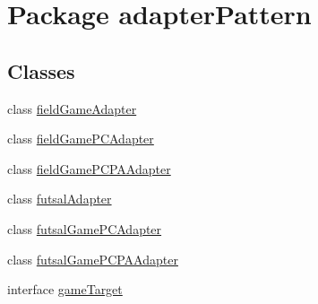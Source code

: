 \hypertarget{namespaceadapter_pattern}{}\section{Package adapter\+Pattern}
\label{namespaceadapter_pattern}
\subsection*{Classes}
\begin{DoxyCompactItemize}
\item 
class \mbox{\hyperlink{classadapter_pattern_1_1field_game_adapter}{field\+Game\+Adapter}}
\item 
class \mbox{\hyperlink{classadapter_pattern_1_1field_game_p_c_adapter}{field\+Game\+P\+C\+Adapter}}
\item 
class \mbox{\hyperlink{classadapter_pattern_1_1field_game_p_c_p_a_adapter}{field\+Game\+P\+C\+P\+A\+Adapter}}
\item 
class \mbox{\hyperlink{classadapter_pattern_1_1futsal_adapter}{futsal\+Adapter}}
\item 
class \mbox{\hyperlink{classadapter_pattern_1_1futsal_game_p_c_adapter}{futsal\+Game\+P\+C\+Adapter}}
\item 
class \mbox{\hyperlink{classadapter_pattern_1_1futsal_game_p_c_p_a_adapter}{futsal\+Game\+P\+C\+P\+A\+Adapter}}
\item 
interface \mbox{\hyperlink{interfaceadapter_pattern_1_1game_target}{game\+Target}}
\end{DoxyCompactItemize}
